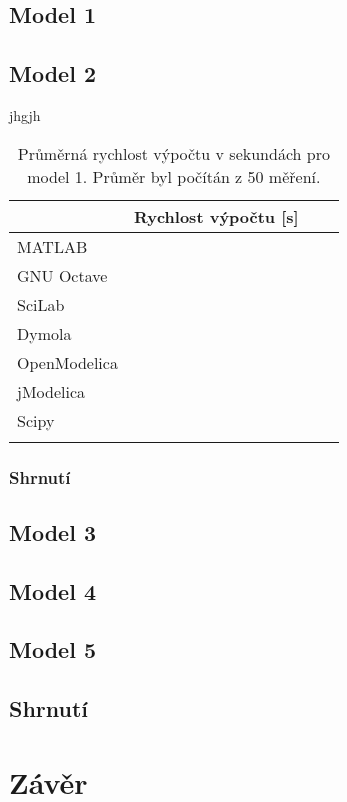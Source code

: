 \section{Model 1}
\label{srovnani-micek}

\section{Model 2}
\label{srovnani-kruh}
jhgjh
\begin{table}[]
\centering
\begin{tabular}{|l|l|l|l|}
\hline
             & Rychlost výpočtu {[}s{]} &  &  \\ \hline
MATLAB       &                          &  &  \\ \hline
GNU Octave   &                          &  &  \\ \hline
SciLab       &                          &  &  \\ \hline
Dymola       &                          &  &  \\ \hline
OpenModelica &                          &  &  \\ \hline
jModelica    &                          &  &  \\ \hline
Scipy        &                          &  &  \\ \hline
             &                          &  &  \\ \hline
\end{tabular}
\caption{Průměrná rychlost výpočtu v sekundách pro model 1. Průměr byl počítán z 50 měření.}
\label{tab:kruh-rychlost}
\end{table}

\subsection{Shrnutí}

\section{Model 3}
\label{srovnani-tuhy}

\section{Model 4}

\section{Model 5}

\section{Shrnutí}




\chapter{Závěr}
\label{kapitola6}



